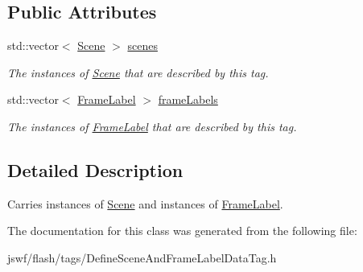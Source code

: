 \subsection*{Public Attributes}
\begin{DoxyCompactItemize}
\item 
\hypertarget{classjswf_1_1flash_1_1tags_1_1_define_scene_and_frame_label_data_tag_ab9441381394fa591ec29756c8a4d97f6}{std\+::vector$<$ \hyperlink{structjswf_1_1flash_1_1_scene}{Scene} $>$ \hyperlink{classjswf_1_1flash_1_1tags_1_1_define_scene_and_frame_label_data_tag_ab9441381394fa591ec29756c8a4d97f6}{scenes}}\label{classjswf_1_1flash_1_1tags_1_1_define_scene_and_frame_label_data_tag_ab9441381394fa591ec29756c8a4d97f6}

\begin{DoxyCompactList}\small\item\em The instances of \hyperlink{structjswf_1_1flash_1_1_scene}{Scene} that are described by this tag. \end{DoxyCompactList}\item 
\hypertarget{classjswf_1_1flash_1_1tags_1_1_define_scene_and_frame_label_data_tag_a4419863b88233717dc8c95d99fc0dfa1}{std\+::vector$<$ \hyperlink{structjswf_1_1flash_1_1_frame_label}{Frame\+Label} $>$ \hyperlink{classjswf_1_1flash_1_1tags_1_1_define_scene_and_frame_label_data_tag_a4419863b88233717dc8c95d99fc0dfa1}{frame\+Labels}}\label{classjswf_1_1flash_1_1tags_1_1_define_scene_and_frame_label_data_tag_a4419863b88233717dc8c95d99fc0dfa1}

\begin{DoxyCompactList}\small\item\em The instances of \hyperlink{structjswf_1_1flash_1_1_frame_label}{Frame\+Label} that are described by this tag. \end{DoxyCompactList}\end{DoxyCompactItemize}


\subsection{Detailed Description}
Carries instances of \hyperlink{structjswf_1_1flash_1_1_scene}{Scene} and instances of \hyperlink{structjswf_1_1flash_1_1_frame_label}{Frame\+Label}. 

The documentation for this class was generated from the following file\+:\begin{DoxyCompactItemize}
\item 
jswf/flash/tags/Define\+Scene\+And\+Frame\+Label\+Data\+Tag.\+h\end{DoxyCompactItemize}

